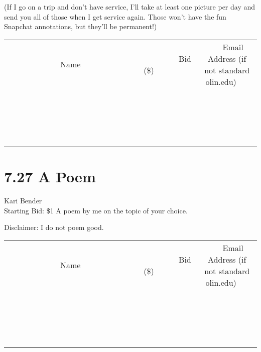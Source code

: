 \documentclass[11pt]{article}
\begin{document}
(If I go on a trip and don't have service, I'll take at least one picture per day and send you all of those when I get service again. Those won't have the fun Snapchat annotations, but they'll be permanent!)
\\[3ex]
\begin{tabular}{c c c}
~~~~~~~~~~~~~Name~~~~~~~~~~~~~ & ~~~~~~~~~Bid (\$)~~~~~~~~~  & ~~~Email Address (if not standard olin.edu)~~~\\
 & & \\
\hline
 & & \\
\hline
 & & \\
\hline
 & & \\
\hline
 & & \\
\hline
 & & \\
\hline
 & & \\
\hline
 & & \\
\hline
 & & \\
\hline
 & & \\
\hline
 & & \\
\hline
 & & \\
\hline
 & & \\
\hline
 & & \\
\hline
 & & \\
\hline
 & & \\
\hline
 & & \\
\hline
 & & \\
\hline
 & & \\
\hline
\end{tabular}
\newpage
\section*{7.27 A Poem}
Kari Bender
\\
Starting Bid: \$1
\newline
A poem by me on the topic of your choice.

Disclaimer: I do not poem good.
\\[3ex]
\begin{tabular}{c c c}
~~~~~~~~~~~~~Name~~~~~~~~~~~~~ & ~~~~~~~~~Bid (\$)~~~~~~~~~  & ~~~Email Address (if not standard olin.edu)~~~\\
 & & \\
\hline
 & & \\
\hline
 & & \\
\hline
 & & \\
\hline
 & & \\
\hline
 & & \\
\hline
 & & \\
\hline
 & & \\
\hline
 & & \\
\hline
 & & \\
\hline
 & & \\
\hline
 & & \\
\hline
 & & \\
\hline
 & & \\
\hline
 & & \\
\hline
 & & \\
\hline
 & & \\
\hline
 & & \\
\hline
 & & \\
\hline
\end{tabular}
\newpage
\end{document}

